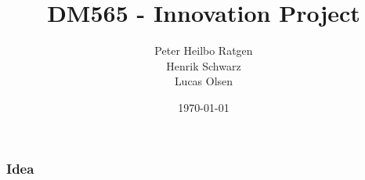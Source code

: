 \documentclass{beamer}
\title{DM565 - Innovation Project}
\author{Peter Heilbo Ratgen \\ Henrik Schwarz \\ Lucas Olsen}
\date{\today}
\begin{document}
\frame{\titlepage}

\begin{frame}
  \frametitle{Idea}
\end{frame}
\end{document}
